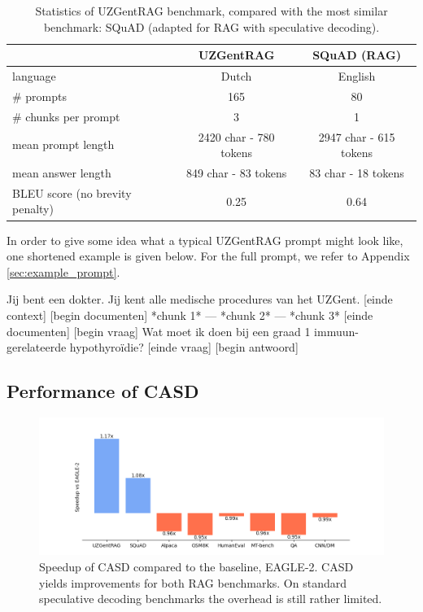 \begin{table}[h]
    \centering
    \begin{tabular}{l|cc}
         & UZGentRAG & SQuAD (RAG) \\
        \hline
        language & Dutch & English \\
        \# prompts & 165 & 80 \\
        \# chunks per prompt & 3 & 1 \\ 
        mean prompt length & 2420 char - 780 tokens & 2947 char - 615 tokens\\
        mean answer length & 849 char - 83 tokens & 83 char - 18 tokens\\
        BLEU score (no brevity penalty) & 0.25 & 0.64\\
    \end{tabular}
    \caption{Statistics of UZGentRAG benchmark, compared with the most similar benchmark: SQuAD (adapted for RAG with speculative decoding).}
    \label{tab:uzgentrag_benchmark}
\end{table}

In order to give some idea what a typical UZGentRAG prompt might look like, one shortened example is given below. For the full prompt, we refer to Appendix \ref{sec:example_prompt}.

\begin{wrapverbatim}
Jij bent een dokter. Jij kent alle medische procedures van het UZGent.
[einde context]
[begin documenten]
*chunk 1*
---
*chunk 2*
---
*chunk 3*
[einde documenten]
[begin vraag]
Wat moet ik doen bij een graad 1 immuun-gerelateerde hypothyroïdie?
[einde vraag]
[begin antwoord]

\end{wrapverbatim}


\subsection{Performance of CASD}
\begin{figure}[h]
  \centering
  \captionsetup{justification=centering}
  \includegraphics[width=\linewidth]{fig/speedup_vs_eagle.png}
  \caption{Speedup of CASD compared to the baseline, EAGLE-2. CASD yields improvements for both RAG benchmarks. On standard speculative decoding benchmarks the overhead is still rather limited.}
  \label{fig:speedup_vs_eagle}
\end{figure}

